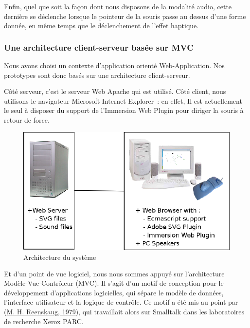 \documentclass[
]{book}
\begin{document}
Enfin, quel que soit la façon dont nous disposons de la modalité audio,
cette dernière se déclenche lorsque le pointeur de la souris passe au dessus
d'une forme donnée, en même temps que le déclenchement de l'effet
haptique.

\hypertarget{une-architecture-client-serveur-basuxe9e-sur-mvc}{%
\subsubsection{Une architecture client-serveur basée sur MVC}\label{une-architecture-client-serveur-basuxe9e-sur-mvc}}

Nous avons choisi un contexte d'application orienté Web-Application. Nos
prototypes sont donc basés sur une architecture client-serveur.

Côté serveur, c'est le serveur Web Apache qui est utilisé. Côté client,
nous utilisons le navigateur Microsoft Internet Explorer~: en effet, Il
est actuellement le seul à disposer du support de l'Immersion Web Plugin pour
diriger la souris à retour de force.

\begin{figure}
\centering
\includegraphics{img/archi.png}
\caption{\label{fig:architecture}Architecture du système}
\end{figure}

Et d'un point de vue logiciel, nous nous sommes appuyé sur l'architecture
Modèle-Vue-Contrôleur (MVC). Il s'agit d'un motif de conception pour le
développement d'applications logicielles, qui sépare le modèle de données,
l'interface utilisateur et la logique de contrôle. Ce motif a été mis au
point par (\protect\hyperlink{ref-Reenskaug:1979a:ext}{M. H. Reenskaug, 1979}), qui travaillait alors sur Smalltalk dans
les laboratoires de recherche Xerox PARC.
\end{document}
